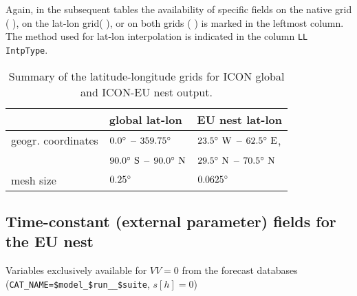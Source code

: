Again, in the subsequent tables the availability of specific fields on the native grid ($\,$\markRed$\,$), 
on the lat-lon grid($\,$\markBlue$\,$), or on both grids ($\,$\markRed\markBlue$\,$) is marked in the leftmost 
column. The method used for lat-lon interpolation is indicated in the column \texttt{LL IntpType}.
%
\begin{table}[hbt]
  \centering
  \begin{tabular}{|p{5cm}|p{4.5cm}|p{4.5cm}|}\hline
    \rowcolor{Gray}
                               &    \centering\arraybackslash\textbf{global lat-lon}          &     \centering\arraybackslash\textbf{EU nest lat-lon} \\ \hline\hline
    geogr. coordinates         &    $  0.0^{\circ}$          -- $359.75^{\circ}$                     &     $ 23.5^{\circ}~\text{W}$ -- $62.5^{\circ}~\text{E}$, \\
                               &    $ 90.0^{\circ}~\text{S}$ -- $ 90.0^{\circ}~\text{N}$              &     $ 29.5^{\circ}~\text{N}$ -- $70.5^{\circ}~\text{N}$ \\
    mesh size                  &    $0.25^{\circ}$                                &     $0.0625^{\circ}$ \\
    \hline
  \end{tabular}
  \caption{Summary of the latitude-longitude grids for ICON global and ICON-EU nest output.}%
  \label{tab:ICON_latlon_summary}
\end{table}


\subsection{Time-constant (external parameter) fields for the EU nest}

\renewcommand{\onlyglb}[1]{}
\renewcommand{\onlyloc}[1]{#1}
%
\begin{vartable}{\caption{Variables exclusively available for $VV=0$ from the forecast databases (\texttt{CAT\_NAME=\$model\_\$run\_\_\$suite}, $s[h]=0$)}\label{table:nest:init_output}}

  

\end{vartable}


